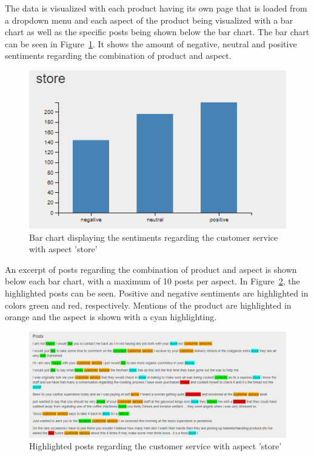 \documentclass[10pt,a4paper]{article}
\begin{document}
	The data is visualized with each product having its own page that is loaded from a dropdown menu and each aspect of the product being visualized with a bar chart as well as the specific posts being shown below the bar chart. The bar chart can be seen in Figure~\ref{fig:barchart}. It shows the amount of negative, neutral and positive sentiments regarding the combination of product and aspect.
	
	\begin{figure}[h]
		\centering
		\includegraphics[width=0.7\linewidth]{data/barchart}
		\caption{Bar chart displaying the sentiments regarding the customer service with aspect 'store'}
		\label{fig:barchart}
	\end{figure}
		
	An excerpt of posts regarding the combination of product and aspect is shown below each bar chart, with a maximum of 10 posts per aspect. In Figure~\ref{fig:posts}, the highlighted posts can be seen. Positive and negative sentiments are highlighted in colors green and red, respectively. Mentions of the product are highlighted in orange and the aspect is shown with a cyan highlighting.
		
	\begin{figure}[h]
		\centering
		\includegraphics[width=0.9\linewidth]{data/posts}
		\caption{Highlighted posts regarding the customer service with aspect 'store'}
		\label{fig:posts}
	\end{figure}
	
\end{document}
